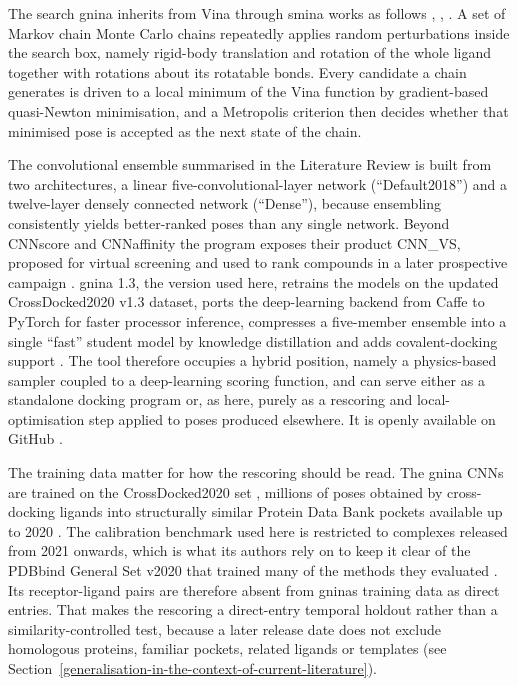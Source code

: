 The search gnina inherits from Vina through smina works as follows \cite{ref022}, \cite{ref056}, \cite{ref067}. A set of Markov chain Monte Carlo chains repeatedly applies random perturbations inside the search box, namely rigid-body translation and rotation of the whole ligand together with rotations about its rotatable bonds. Every candidate a chain generates is driven to a local minimum of the Vina function by gradient-based quasi-Newton minimisation, and a Metropolis criterion then decides whether that minimised pose is accepted as the next state of the chain.

The convolutional ensemble summarised in the Literature Review is built from two architectures, a linear five-convolutional-layer network (``Default2018'') and a twelve-layer densely connected network (``Dense''), because ensembling consistently yields better-ranked poses than any single network. Beyond CNNscore and CNNaffinity the program exposes their product CNN\_VS, proposed for virtual screening \cite{ref083} and used to rank compounds in a later prospective campaign \cite{ref068}. gnina 1.3, the version used here, retrains the models on the updated CrossDocked2020 v1.3 dataset, ports the deep-learning backend from Caffe to PyTorch for faster processor inference, compresses a five-member ensemble into a single ``fast'' student model by knowledge distillation and adds covalent-docking support \cite{ref067}. The tool therefore occupies a hybrid position, namely a physics-based sampler coupled to a deep-learning scoring function, and can serve either as a standalone docking program or, as here, purely as a rescoring and local-optimisation step applied to poses produced elsewhere. It is openly available on GitHub \cite{ref058}.

The training data matter for how the rescoring should be read. The gnina CNNs are trained on the CrossDocked2020 set \cite{ref059}, millions of poses obtained by cross-docking ligands into structurally similar Protein Data Bank pockets available up to 2020 \cite{ref056}. The calibration benchmark used here is restricted to complexes released from 2021 onwards, which is what its authors rely on to keep it clear of the PDBbind General Set v2020 that trained many of the methods they evaluated \cite{ref035}. Its receptor-ligand pairs are therefore absent from gnina\textquotesingle s training data as direct entries. That makes the rescoring a direct-entry temporal holdout rather than a similarity-controlled test, because a later release date does not exclude homologous proteins, familiar pockets, related ligands or templates (see Section~\ref{generalisation-in-the-context-of-current-literature}).

